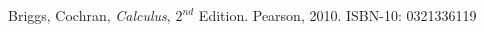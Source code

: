 

\begin{thebibliography}{9}

Briggs, Cochran, {\it Calculus}, $2^{nd}$ Edition.  Pearson, 2010.  ISBN-10: 0321336119

\end{thebibliography}
